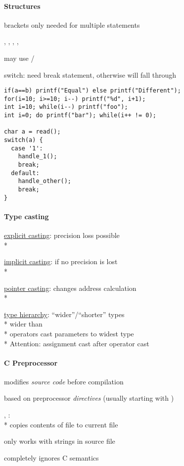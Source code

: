 \paragraph{Structures}
\begin{items}
  \item brackets only needed for multiple statements
  \item {}, , , , 
  \item may use /
  \item switch: need break statement, otherwise will fall through
\end{items}
\begin{lstlisting}[style=customc]
if(a==b) printf("Equal") else printf("Different");
for(i=10; i>=10; i--) printf("%d", i+1);
int i=10; while(i--) printf("foo");
int i=0; do printf("bar"); while(i++ != 0);

char a = read();
switch(a) {
  case '1':
    handle_1();
    break;
  default:
    handle_other();
    break;
}
\end{lstlisting}

\paragraph{Type casting}
\begin{items}
  \item \underline{explicit casting}: precision loss possible \\*
  \item \underline{implicit casting}: if no precision is lost \\*
  \item \underline{pointer casting}: changes address calculation \\*
  \item \underline{type hierarchy}: "`wider"'/"`shorter"' types \\*
     wider than  \\*
    operators cast parameters to widest type \\*
    Attention: assignment cast after operator cast
\end{items}

\paragraph{C Preprocessor}
\begin{items}
  \item modifies \emph{source code} before compilation
  \item based on preprocessor \emph{directives} (usually starting with \code{#})
  \item {}, : \\*
    copies contents of file to current file
  \item only works with strings in source file
  \item completely ignores C semantics
\end{items}

